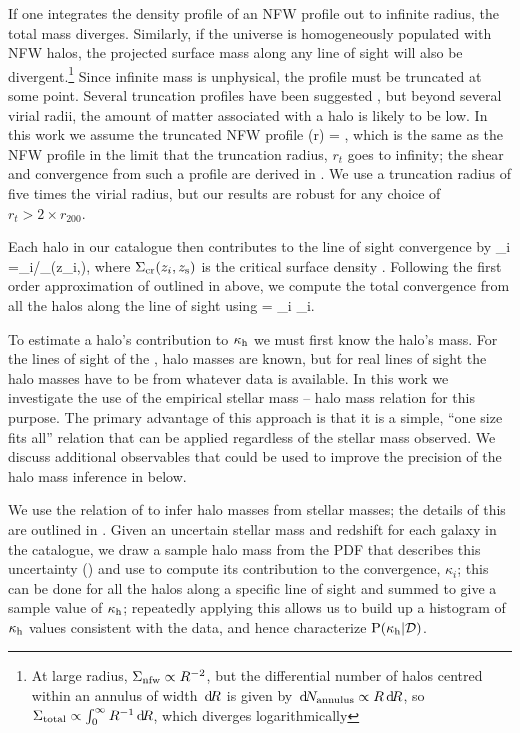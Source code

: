 \documentclass[useAMS,usenatbib]{mn2e}
\begin{document}
If one integrates the density profile of an NFW profile out to infinite
radius, the total mass diverges. Similarly, if the universe is
homogeneously populated with NFW halos, the projected surface mass along
any line of sight will also be divergent.\footnote{At large radius,
$\Sigma_{\rm nfw} \propto R^{-2}$, but the differential number of halos
centred within an annulus of width $\, \mathrm{d} \! R$ is given by $\, \mathrm{d} \! N_{\rm
annulus} \propto R \, \mathrm{d} \! R$, so  $\Sigma_{\rm total} \propto
\int_{0}^{\infty} R^{-1} \, \mathrm{d} \! R$, which diverges logarithmically} Since
infinite mass is unphysical, the profile must be truncated at some
point. Several truncation profiles have been suggested
\citep[e.g][]{BMO}, but beyond several virial radii, the amount of
matter associated with a halo is likely to be low. In this work we
assume the truncated NFW profile
\be\label{eq:bmoprofile}
\rho(r) = 
,
\ee
which is the same as the NFW profile in the limit that the truncation
radius, $r_t$ goes to infinity; the shear and convergence from such a
profile are derived in \citet{BMO}.
 We use a truncation radius of five times
the virial radius, but our results are robust for any choice of $r_t>2
\times r_{200}$. 

Each halo in our catalogue then contributes to
the line of sight convergence by
\be
\label{eq:kappai}
\kappa_i =\Sigma_{i}/\Sigma_{}(z_i,\zs),
\ee
where $\Sigma_{\mathrm{cr}}(z_i,z_{\rm s})$ is the critical surface density .
Following the first order approximation of \citet{HilbertEtal2009}
outlined in  above, we compute 
the total convergence from all the halos along the line
of sight using
\be 
\label{eq:kappasummu}
\kappah = \sum_{i} \kappa_i.
\ee

To estimate a halo's contribution to $\kappa_{\rm h}$ we must first know the
halo's mass. For the lines of sight of the \MS, halo masses are
known, but for  real lines of sight the halo masses have to be \infered
from whatever data is available. 
In this work we investigate the use of the empirical stellar mass --
halo mass relation for this purpose. The primary advantage of this
approach is that it is a simple, ``one size fits all'' relation that can
be applied regardless of the stellar mass observed. We discuss
additional observables that could be used to improve the precision of
the halo mass inference in  below. 

We use the relation of \citet{BehrooziEtal2010} to infer halo masses
from stellar masses; the details of this \proceedure are outlined in 
. Given an uncertain stellar mass and redshift for
each galaxy in the  catalogue, we draw a sample halo mass from the PDF
that describes this uncertainty  ()  and use
 to compute its contribution to the convergence,
$\kappa_i$; this can be done for all the halos along a specific line of sight
and summed to give a sample value of $\kappa_{\rm h}$;  repeatedly applying
this \proceedure allows us to build up a histogram of $\kappa_{\rm h}$ values
consistent with the data, and hence characterize ${\rm P}(\kappa_{\rm h}|{\mathcal{D}})$. 
\end{document}

